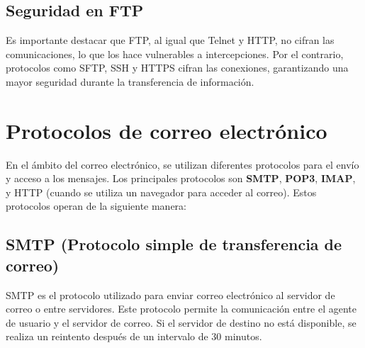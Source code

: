 \documentclass{article}
\begin{document}
\subsection{Seguridad en FTP}

Es importante destacar que FTP, al igual que Telnet y HTTP, no cifran las comunicaciones, lo que los hace vulnerables a intercepciones. Por el contrario, protocolos como SFTP, SSH y HTTPS cifran las conexiones, garantizando una mayor seguridad durante la transferencia de información.

\newpage

\section{Protocolos de correo electrónico}

En el ámbito del correo electrónico, se utilizan diferentes protocolos para el envío y acceso a los mensajes. Los principales protocolos son \textbf{SMTP}, \textbf{POP3}, \textbf{IMAP}, y HTTP (cuando se utiliza un navegador para acceder al correo). Estos protocolos operan de la siguiente manera:

\subsection{SMTP (Protocolo simple de transferencia de correo)}
SMTP es el protocolo utilizado para enviar correo electrónico al servidor de correo o entre servidores. Este protocolo permite la comunicación entre el agente de usuario y el servidor de correo. Si el servidor de destino no está disponible, se realiza un reintento después de un intervalo de 30 minutos.
\end{document}
